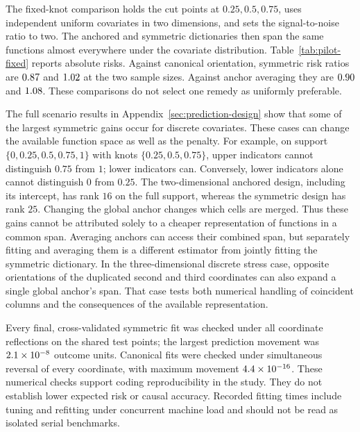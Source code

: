 \documentclass[11pt]{article}
\theoremstyle{definition}
\theoremstyle{remark}
\begin{document}
The fixed-knot comparison holds the cut points at $0.25,0.5,0.75$, uses
independent uniform covariates in two dimensions, and sets the
signal-to-noise ratio to two. The anchored and symmetric dictionaries then
span the same functions almost everywhere under the covariate distribution.
Table~\ref{tab:pilot-fixed} reports absolute risks. Against canonical
orientation, symmetric risk ratios are $0.87$ and
$1.02$ at the two sample sizes. Against anchor
averaging they are $0.90$ and
$1.08$. These comparisons do not select one remedy
as uniformly preferable.



The full scenario results in Appendix~\ref{sec:prediction-design} show that
some of the largest symmetric gains occur for discrete covariates. These
cases can change the available function space as well as the penalty.
For example, on support $\{0,0.25,0.5,0.75,1\}$ with knots
$\{0.25,0.5,0.75\}$, upper indicators cannot distinguish $0.75$ from $1$;
lower indicators can. Conversely, lower indicators alone cannot distinguish
$0$ from $0.25$. The two-dimensional anchored design, including its
intercept, has rank $16$ on the full support, whereas the symmetric design
has rank $25$. Changing the global anchor changes which cells are merged.
Thus these gains cannot be attributed solely to a cheaper representation
of functions in a common span. Averaging anchors can access their combined
span, but separately fitting and averaging them is a different estimator
from jointly fitting the symmetric dictionary.
In the three-dimensional discrete stress case, opposite orientations of the
duplicated second and third coordinates can also expand a single global
anchor's span. That case tests both numerical handling of coincident columns
and the consequences of the available representation.

Every final, cross-validated symmetric fit was checked under all coordinate
reflections on the
shared test points; the largest prediction movement was
$2.1\times10^{-8}$ outcome units. Canonical fits were checked under
simultaneous reversal of every coordinate, with maximum movement
$4.4\times10^{-16}$. These numerical checks support coding
reproducibility in the study. They do not establish lower expected risk or
causal accuracy. Recorded fitting times include tuning and refitting under
concurrent machine load and should not be read as isolated serial benchmarks.
\end{document}
